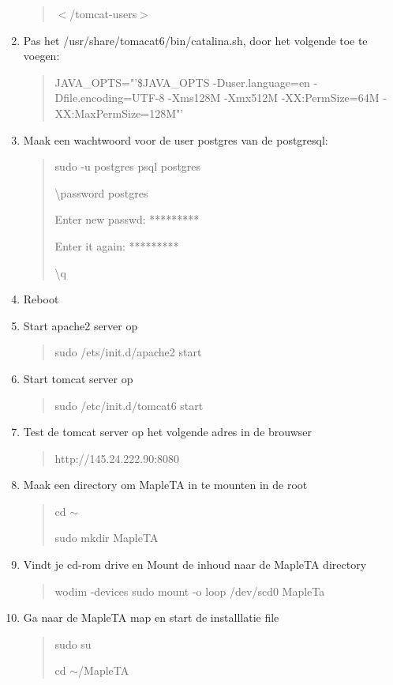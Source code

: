 \begin{enumerate}
\begin{quote}
				$<$/tomcat-users$>$
			\end{quote} 
	\item Pas het  /usr/share/tomacat6/bin/catalina.sh, door het volgende toe te voegen:
			\begin{quote}
				JAVA\_OPTS="'\$JAVA\_OPTS -Duser.language=en -Dfile.encoding=UTF-8 -Xms128M -Xmx512M -XX:PermSize=64M -XX:MaxPermSize=128M"'
			\end{quote}
		\item Maak een wachtwoord voor de user postgres van de postgresql:
	    \begin{quote}
				sudo -u postgres psql postgres
				
				\textbackslash password postgres
				
				\quad Enter new passwd: *********
				
				\quad Enter it again: *********
				
				\textbackslash q 
			\end{quote}
		\item Reboot 
		\item Start apache2 server op
			\begin{quote}
					sudo /ets/init.d/apache2 start
			\end{quote}
		\item Start tomcat server op 
			\begin{quote}
					sudo /etc/init.d/tomcat6 start
			\end{quote}
		\item Test de tomcat server op het volgende adres in de brouwser
			\begin{quote}
					http://145.24.222.90:8080
			\end{quote}
		\item Maak een directory om MapleTA in te mounten in de root
			\begin{quote}
					cd $\sim$
					
					sudo mkdir MapleTA
			\end{quote}
		\item Vindt je cd-rom drive en Mount de inhoud naar de MapleTA directory
			\begin{quote}
					wodim -devices
					sudo mount -o loop /dev/scd0 MapleTa
			\end{quote}
		\item Ga naar de MapleTA map en start de installlatie file
			\begin{quote}
					sudo su
					
					cd $\sim$/MapleTA
					

\end{quote}
\end{enumerate}
